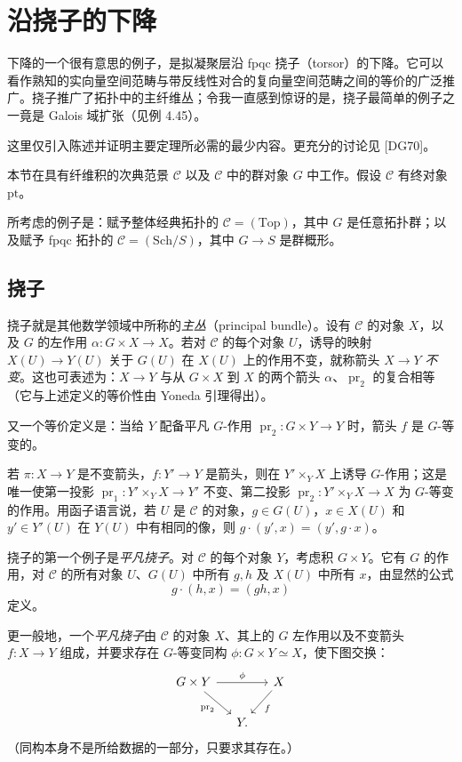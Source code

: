 \section{沿挠子的下降}\label{ch04:sec44}
下降的一个很有意思的例子，是拟凝聚层沿 fpqc 挠子（torsor）的下降。它可以看作熟知的实向量空间范畴与带反线性对合的复向量空间范畴之间的等价的广泛推广。挠子推广了拓扑中的主纤维丛；令我一直感到惊讶的是，挠子最简单的例子之一竟是 Galois 域扩张（见例 4.45）。

这里仅引入陈述并证明主要定理所必需的最少内容。更充分的讨论见 [DG70]。

本节在具有纤维积的次典范景 $\mathcal C$ 以及 $\mathcal C$ 中的群对象 $G$ 中工作。假设 $\mathcal C$ 有终对象 $\mathrm{pt}$。

所考虑的例子是：赋予整体经典拓扑的 $\mathcal C=(\mathrm{Top})$，其中 $G$ 是任意拓扑群；以及赋予 fpqc 拓扑的 $\mathcal C=(\mathrm{Sch}/S)$，其中 $G\to S$ 是群概形。

\subsection{挠子}
挠子就是其他数学领域中所称的\emph{主丛}（principal bundle）。设有 $\mathcal C$ 的对象 $X$，以及 $G$ 的左作用 $\alpha\colon G\times X\to X$。若对 $\mathcal C$ 的每个对象 $U$，诱导的映射 $X(U)\to Y(U)$ 关于 $G(U)$ 在 $X(U)$ 上的作用不变，就称箭头 $X\to Y$ \emph{不变}。这也可表述为：$X\to Y$ 与从 $G\times X$ 到 $X$ 的两个箭头 $\alpha$、$\operatorname{pr}_2$ 的复合相等（它与上述定义的等价性由 Yoneda 引理得出）。

又一个等价定义是：当给 $Y$ 配备平凡 $G$-作用 $\operatorname{pr}_2\colon G\times Y\to Y$ 时，箭头 $f$ 是 $G$-等变的。

若 $\pi\colon X\to Y$ 是不变箭头，$f\colon Y'\to Y$ 是箭头，则在 $Y'\times_Y X$ 上诱导 $G$-作用；这是唯一使第一投影 $\operatorname{pr}_1\colon Y'\times_Y X\to Y'$ 不变、第二投影 $\operatorname{pr}_2\colon Y'\times_Y X\to X$ 为 $G$-等变的作用。用函子语言说，若 $U$ 是 $\mathcal C$ 的对象，$g\in G(U)$，$x\in X(U)$ 和 $y'\in Y'(U)$ 在 $Y(U)$ 中有相同的像，则
$g\cdot(y',x)=(y',g\cdot x)$。

挠子的第一个例子是\emph{平凡挠子}。对 $\mathcal C$ 的每个对象 $Y$，考虑积 $G\times Y$。它有 $G$ 的作用，对 $\mathcal C$ 的所有对象 $U$、$G(U)$ 中所有 $g,h$ 及 $X(U)$ 中所有 $x$，由显然的公式
\[
 g\cdot(h,x)=(gh,x)
\]
定义。

更一般地，一个\emph{平凡挠子}由 $\mathcal C$ 的对象 $X$、其上的 $G$ 左作用以及不变箭头 $f\colon X\to Y$ 组成，并要求存在 $G$-等变同构 $\phi\colon G\times Y\simeq X$，使下图交换：
\[
\begin{tikzcd}[column sep=1.2em]
 G\times Y\arrow[rr,"{\phi}"]\arrow[dr,"{\operatorname{pr}_2}"']&&X\arrow[dl,"{f}"]\\
 &Y.
\end{tikzcd}
\]
（同构本身不是所给数据的一部分，只要求其存在。）

